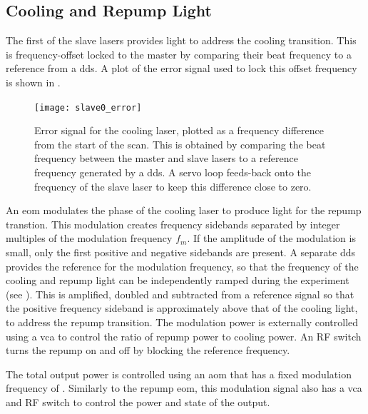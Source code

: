 \subsection{Cooling and Repump Light}
The first of the slave lasers provides light to address the cooling transition. This is
frequency-offset locked to the master by comparing their beat frequency to a
reference from a \ac{dds}. A plot of the error signal used to lock this offset
frequency is shown in .
\begin{figure}[!htbp]
	\centering
	\texttt{[image: slave0\_error]}
	\caption[Error Signal for the \Muquans\ Cooling laser.]{Error signal for the \Muquans cooling laser, plotted as a frequency difference from the start of the scan. This is obtained by comparing the beat frequency between the master and slave lasers to a reference frequency generated by a \ac{dds}. A servo loop feeds-back onto the frequency of the slave laser to keep this difference close to zero.}\label{fig:slave_offset}
\end{figure}
\par\noindent An \ac{eom} modulates the phase of the cooling laser to produce light for the  repump transtion. This modulation creates frequency sidebands separated by integer multiples of the modulation frequency
\(f_m\). If the amplitude of the modulation is small, only the first
positive and negative sidebands are present. A separate \ac{dds} provides the reference for the modulation frequency, so that the frequency of the cooling and repump
light can be independently ramped during the experiment (see
). This is amplified, doubled and subtracted
from a  reference signal so that the positive
frequency sideband is approximately  above that of the
cooling light, to address the repump transition. The modulation power is externally controlled using a \ac{vca} to control the ratio of
repump power to cooling power. An RF switch turns the repump on and off by blocking the reference frequency. \par\noindent The total output power is controlled using an
\ac{aom} that has a fixed modulation frequency of .
Similarly to the repump \ac{eom}, this modulation signal also has a \ac{vca} and RF switch to control the power and state of the output.

